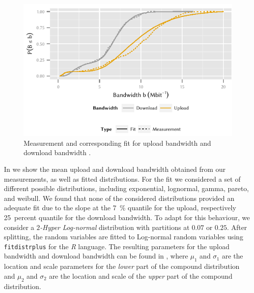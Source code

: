 \begin{figure}
  \includegraphics{application/cloud_file_synchronization/application_measurements/figures/bandwidths}
  \caption{Measurement and corresponding fit for upload bandwidth \uploadbandwidth and download bandwidth \downloadbandwidth.}
  \label{fig:application:cloud_file_synchronisation:application_measurements:bandwidth_preparation_times:measurement_setup:bandwidths}
\end{figure}

In  we show the mean upload and download bandwidth obtained from our measurements, as well as fitted distributions.
For the fit we considered a set of different possible distributions, including exponential, lognormal, gamma, pareto, and weibull.
We found that none of the considered distributions provided an adequate fit due to the slope at the \SI{7}{\percent} quantile for the upload, respectively \SI{25}{percent} quantile for the download bandwidth.
To adapt for this behaviour, we consider a \emph{$2$-Hyper Log-normal} distribution \cite{Wang2006} with partitions at \(0.07\) or \({0.25}\).
After splitting, the random variables are fitted to Log-normal random variables using \texttt{fitdistrplus} for the \emph{R} language.
The resulting parameters for the upload bandwidth \uploadbandwidth and download bandwidth \downloadbandwidth can be found in , where \(\mu_1\) and \(\sigma_1\) are the location and scale parameters for the \emph{lower} part of the compound distribution and \(\mu_2\) and \(\sigma_2\) are the location and scale of the \emph{upper} part of the compound distribution.

